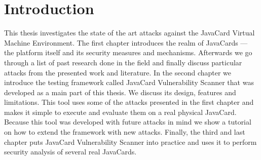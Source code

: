 \section{Introduction}

This thesis investigates the state of the art attacks against the JavaCard Virtual Machine Environment. The first chapter introduces the realm of JavaCards --- the platform itself and its security measures and mechanisms. Afterwards we go through a list of past research done in the field and finally discuss particular attacks from the presented work and literature. In the second chapter we introduce the testing framework called JavaCard Vulnerability Scanner that was developed as a main part of this thesis. We discuss its design, features and limitations. This tool uses some of the attacks presented in the first chapter and makes it simple to execute and evaluate them on a real physical JavaCard. Because this tool was developed with future attacks in mind we show a tutorial on how to extend the framework with new attacks. Finally, the third and last chapter puts JavaCard Vulnerability Scanner into practice and uses it to perform security analysis of several real JavaCards.


